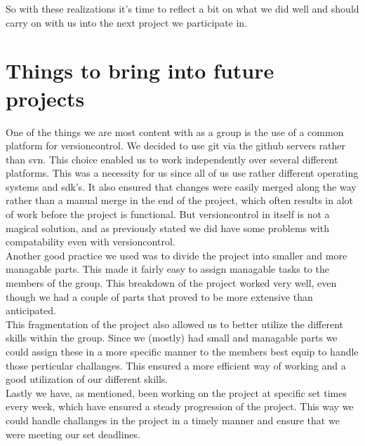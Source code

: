 So with these realizations it's time to reflect a bit on what we did well and should carry on with us into the next project we participate in.

\section{Things to bring into future projects}
One of the things we are most content with as a group is the use of a common platform for versioncontrol. We decided to use git via the github servers rather than svn. This choice enabled us to work independently over several different platforms. This was a necessity for us since all of us use rather different operating systems and sdk's. It also ensured that changes were easily merged along the way rather than a manual merge in the end of the project, which often results in alot of work before the project is functional. But versioncontrol in itself is not a magical solution, and as previously stated we did have some problems with compatability even with versioncontrol. \\
Another good practice we used was to divide the project into smaller and more managable parts. This made it fairly easy to assign managable tasks to the members of the group. This breakdown of the project worked very well, even though we had a couple of parts that proved to be more extensive than anticipated. \\
This fragmentation of the project also allowed us to better utilize the different skills within the group. Since we (mostly) had small and managable parts we could assign these in a more specific manner to the members best equip to handle those perticular challanges. This ensured a more efficient way of working and a good utilization of our different skills. \\
Lastly we have, as mentioned, been working on the project at specific set times every week, which have ensured a steady progression of the project. This way we could handle challanges in the project in a timely manner and  ensure that we were meeting our set deadlines.


